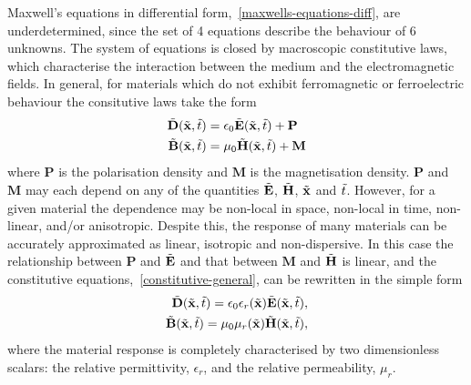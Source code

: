 Maxwell's equations in differential form,~\eqref{maxwells-equations-diff}, are underdetermined, since the set of 4 equations describe the behaviour of 6 unknowns. The system of equations is closed by macroscopic constitutive laws, which characterise the interaction between the medium and the electromagnetic fields. In general, for materials which do not exhibit ferromagnetic or ferroelectric behaviour the consitutive laws take the form
\begin{subequations}
    \label{constitutive-general}
    \begin{align}
        \tilde{\mathbf{D}}(\tilde{\mathbf{x}},\tilde{t}) &= \epsilon_0 \tilde{\mathbf{E}}(\tilde{\mathbf{x}},\tilde{t}) + \mathbf{P} \label{constitutive-general-E} \\
        \tilde{\mathbf{B}}(\tilde{\mathbf{x}},\tilde{t}) &= \mu_0 \tilde{\mathbf{H}}(\tilde{\mathbf{x}},\tilde{t}) + \mathbf{M}
    \end{align}
\end{subequations}
where $\mathbf{P}$ is the polarisation density and $\mathbf{M}$ is the magnetisation density. $\mathbf{P}$ and $\mathbf{M}$ may each depend on any of the quantities $\tilde{\mathbf{E}}$, $\tilde{\mathbf{H}}$, $\tilde{\mathbf{x}}$ and $\tilde{t}$. However, for a given material the dependence may be non-local in space, non-local in time, non-linear, and/or anisotropic. Despite this, the response of many materials can be accurately approximated as linear, isotropic and non-dispersive. In this case the relationship between $\mathbf{P}$ and $\tilde{\mathbf{E}}$ and that between $\mathbf{M}$ and $\tilde{\mathbf{H}}$ is linear, and the constitutive equations,~\eqref{constitutive-general}, can be rewritten in the simple form
%
\begin{subequations}
    \label{constitutive-linear}
    \begin{align}
        \tilde{\mathbf{D}}(\tilde{\mathbf{x}},\tilde{t}) = \epsilon_0 \epsilon_r(\tilde{\mathbf{x}}) \tilde{\mathbf{E}}(\tilde{\mathbf{x}},\tilde{t}), \label{constitutive-linear-D} \\
        \tilde{\mathbf{B}}(\tilde{\mathbf{x}},\tilde{t}) = \mu_0 \mu_r(\tilde{\mathbf{x}}) \tilde{\mathbf{H}}(\tilde{\mathbf{x}},\tilde{t}),
    \end{align}
\end{subequations}
%
where the material response is completely characterised by two dimensionless scalars: the relative permittivity, $\epsilon_r$, and the relative permeability, $\mu_r$.

